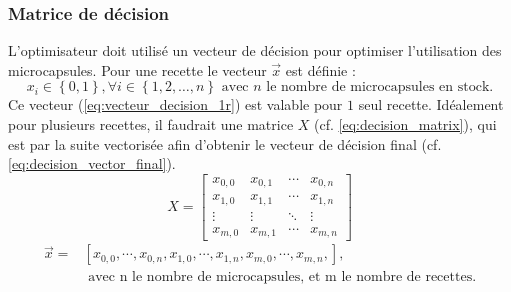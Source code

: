 \subsubsection{Matrice de décision}
L'optimisateur doit utilisé un vecteur de décision pour optimiser l'utilisation des microcapsules. Pour une recette le vecteur $\overrightarrow{x}$ est définie :
\begin{equation}
    x_{i}\in \left\{0, 1\right\}, \forall i\in\left\{1, 2, \dots, n\right\} \text{ avec } n\text{ le nombre de microcapsules en stock.}
    \label{eq:vecteur_decision_1r}
\end{equation}
Ce vecteur (\autoref{eq:vecteur_decision_1r}) est valable pour $1$ seul recette. Idéalement pour plusieurs recettes, il faudrait une matrice $X$ (cf. \autoref{eq:decision_matrix}), qui est par la suite \og vectorisée \fg afin d'obtenir le vecteur de décision final (cf. \autoref{eq:decision_vector_final}). 
\begin{equation}
    X = \left[
        \begin{array}{cccc}
            x_{0, 0} & x_{0, 1} & \cdots & x_{0, n} \\
            x_{1, 0} & x_{1, 1} & \cdots & x_{1, n} \\
            \vdots   & \vdots   & \ddots & \vdots \\
            x_{m, 0} & x_{m, 1} & \cdots & x_{m, n}
        \end{array}
        \right]
    \label{eq:decision_matrix}
\end{equation}
\begin{equation}
    \begin{split}
        \overrightarrow{x} = &\left[x_{0, 0}, \cdots, x_{0, n}, x_{1, 0}, \cdots, x_{1, n}, x_{m, 0}, \cdots, x_{m, n}, \right],\\
        &\text{ avec n le nombre de microcapsules, et m le nombre de recettes.}
    \end{split}
    \label{eq:decision_vector_final}
\end{equation}

